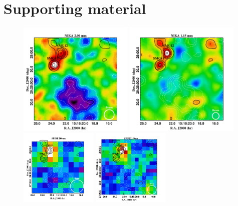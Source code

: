 \documentclass[11pt,a4paper,twoside,graphicx,color]{article}
\begin{document}
\section{Supporting material}
\begin{figure}[h!]
	\centering
	\includegraphics[width=0.49\textwidth]{MultiL_PSZ1G045_2mm.pdf}
	\includegraphics[width=0.49\textwidth]{MultiL_PSZ1G045_1mm.pdf}
	\includegraphics[width=0.33\textwidth]{MultiL_PSZ1G045_500.pdf}
	\includegraphics[width=0.33\textwidth]{MultiL_PSZ1G045_350.pdf}

\end{figure}
\end{document}
